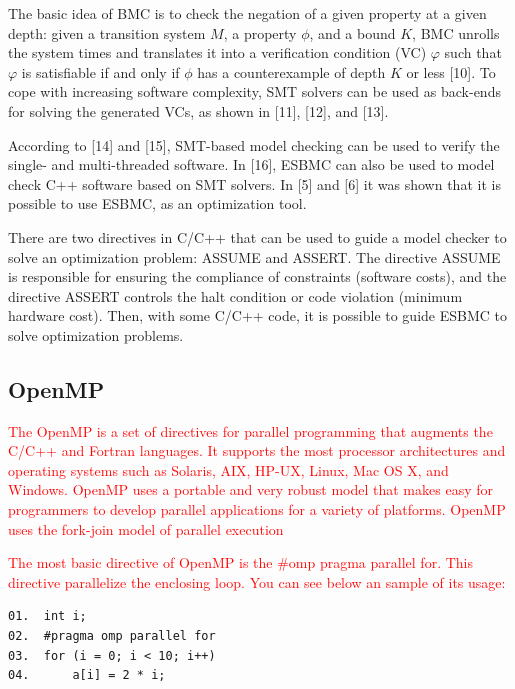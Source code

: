 The basic idea of BMC is to check the negation of a given property at a given depth: given a transition system $ M $, a property $ \phi $, and a bound $ K $, BMC unrolls the system  times and translates it into a verification condition (VC) $ \varphi $  such that $ \varphi $   is satisfiable if and only if $ \phi $ has a counterexample of depth $ K $ or less [10]. To cope with increasing software complexity, SMT solvers can be used as back-ends for solving the generated VCs, as shown in [11], [12], and [13]. 

According to [14] and [15], SMT-based model checking can be used to verify the single- and multi-threaded software. In [16], ESBMC can also be used to model check C++ software based on SMT solvers. In [5] and [6] it was shown that it is possible to use ESBMC, as an optimization tool.

There are two directives in C/C++ that can be used to guide a model checker to solve an optimization problem: ASSUME and ASSERT. The directive ASSUME is responsible for ensuring the compliance of constraints (software costs), and the directive ASSERT controls the halt condition or code violation (minimum hardware cost). Then, with some C/C++ code, it is possible to guide ESBMC to solve optimization problems.

\subsection{OpenMP}
\textcolor{red}{The OpenMP is a set of directives for parallel programming that augments the C/C++ and Fortran languages. It supports the most processor architectures and operating systems such as Solaris, AIX, HP-UX, Linux, Mac OS X, and Windows. OpenMP uses a portable and very robust model that makes easy for programmers to develop parallel applications for a variety of platforms. OpenMP uses the fork-join model of parallel execution \cite{OpenMP1998}}

\textcolor{red}{The most basic directive of OpenMP is the \#omp pragma parallel for. This directive parallelize the enclosing loop. You can see below an sample of its usage:}

\begin{lstlisting}[caption=OpenMP basic sample]
01.  int i;
02.  #pragma omp parallel for
03.  for (i = 0; i < 10; i++)
04.      a[i] = 2 * i;
\end{lstlisting}

